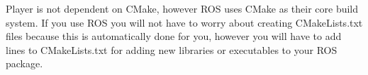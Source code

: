 Player is not dependent on CMake, however ROS uses CMake as their core build system. If you use ROS you will not have to worry about creating CMakeLists.txt files because this is automatically done for you, however you will have to add lines to CMakeLists.txt for adding new libraries or executables to your ROS package.

\newpage
